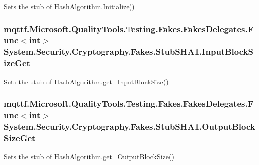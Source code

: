 Sets the stub of Hash\-Algorithm.\-Initialize()

\hypertarget{class_system_1_1_security_1_1_cryptography_1_1_fakes_1_1_stub_s_h_a1_abfafff1c080c58d9467a92bc983a1f9f}{
\subsubsection[{Input\-Block\-Size\-Get}]{\setlength{\rightskip}{0pt plus 5cm}mqttf.\-Microsoft.\-Quality\-Tools.\-Testing.\-Fakes.\-Fakes\-Delegates.\-Func$<$int$>$ System.\-Security.\-Cryptography.\-Fakes.\-Stub\-S\-H\-A1.\-Input\-Block\-Size\-Get}}\label{class_system_1_1_security_1_1_cryptography_1_1_fakes_1_1_stub_s_h_a1_abfafff1c080c58d9467a92bc983a1f9f}


Sets the stub of Hash\-Algorithm.\-get\-\_\-\-Input\-Block\-Size()

\hypertarget{class_system_1_1_security_1_1_cryptography_1_1_fakes_1_1_stub_s_h_a1_a714c00e54d3febead4960b7dfa47ead9}{
\subsubsection[{Output\-Block\-Size\-Get}]{\setlength{\rightskip}{0pt plus 5cm}mqttf.\-Microsoft.\-Quality\-Tools.\-Testing.\-Fakes.\-Fakes\-Delegates.\-Func$<$int$>$ System.\-Security.\-Cryptography.\-Fakes.\-Stub\-S\-H\-A1.\-Output\-Block\-Size\-Get}}\label{class_system_1_1_security_1_1_cryptography_1_1_fakes_1_1_stub_s_h_a1_a714c00e54d3febead4960b7dfa47ead9}


Sets the stub of Hash\-Algorithm.\-get\-\_\-\-Output\-Block\-Size()



